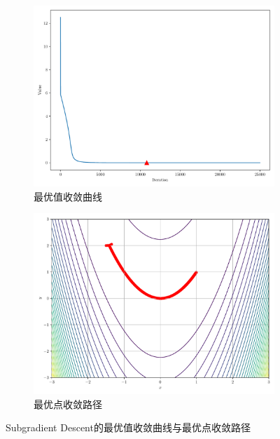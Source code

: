 \begin{figure}[!ht]
    \centering
    \begin{subfigure}{0.4\textwidth}
        \centering
        \includegraphics[width=\textwidth]{figures/Subgradient Descent_loss.pdf}
        \caption{最优值收敛曲线}
    \end{subfigure}
    \begin{subfigure}{0.4\textwidth}
        \centering
        \includegraphics[width=\textwidth]{figures/Subgradient Descent_points.pdf}
        \caption{最优点收敛路径}
    \end{subfigure}
    \caption{Subgradient Descent的最优值收敛曲线与最优点收敛路径}
\end{figure}
